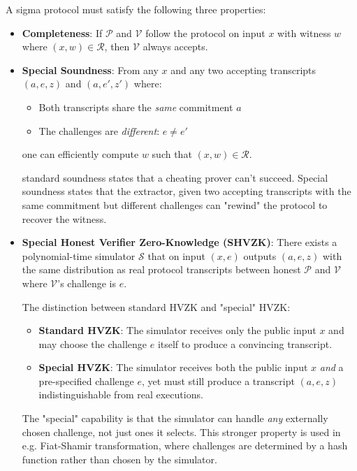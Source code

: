 A sigma protocol must satisfy the following three properties:

\begin{itemize}
    \item \textbf{Completeness}: If $\mathcal{P}$ and $\mathcal{V}$ follow the protocol on input $x$ with witness $w$ where $(x,w) \in \mathcal{R}$, then $\mathcal{V}$ always accepts.
    
    \item \textbf{Special Soundness}: From any $x$ and any two accepting transcripts $(a,e,z)$ and $(a,e',z')$ where:
    \begin{itemize}
        \item Both transcripts share the \emph{same} commitment $a$
        \item The challenges are \emph{different}: $e \neq e'$
    \end{itemize}
    one can efficiently compute $w$ such that $(x,w) \in \mathcal{R}$.
    
    \begin{remark}
    standard soundness states that a cheating prover can't succeed. Special soundness states that the extractor, given two accepting transcripts with the same commitment but different challenges can "rewind" the protocol to recover the witness. 
    \end{remark}
    
    \item \textbf{Special Honest Verifier Zero-Knowledge (SHVZK)}: There exists a polynomial-time simulator $\mathcal{S}$ that on input $(x,e)$ outputs $(a,e,z)$ with the same distribution as real protocol transcripts between honest $\mathcal{P}$ and $\mathcal{V}$ where $\mathcal{V}$'s challenge is $e$.
    
    \begin{remark}
    The distinction between standard HVZK and "special" HVZK:
    \begin{itemize}
        \item \textbf{Standard HVZK}: The simulator receives only the public input $x$ and may choose the challenge $e$ itself to produce a convincing transcript.
        \item \textbf{Special HVZK}: The simulator receives both the public input $x$ \emph{and} a pre-specified challenge $e$, yet must still produce a transcript $(a,e,z)$ indistinguishable from real executions.
    \end{itemize}
    The "special" capability is that the simulator can handle \emph{any} externally chosen challenge, not just ones it selects. This stronger property is used in e.g. Fiat-Shamir transformation, where challenges are determined by a hash function rather than chosen by the simulator.
    \end{remark}
\end{itemize}

